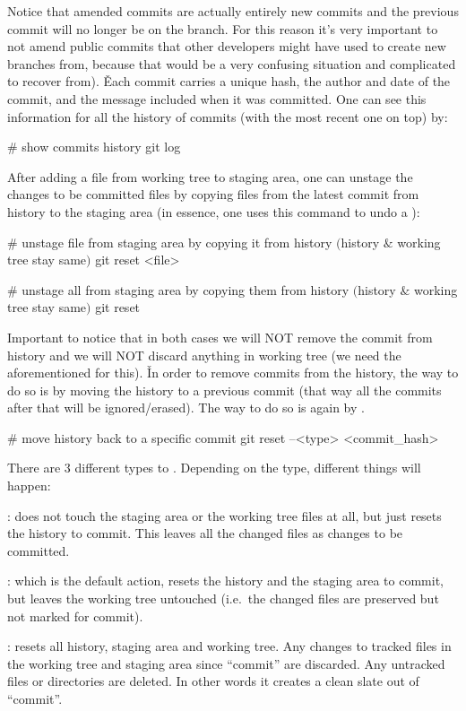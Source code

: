 Notice that amended commits are actually entirely new commits and the previous commit will no longer be on the branch.
For this reason it’s very important to not amend public commits that other developers might have used to create new
branches from, because that would be a very confusing situation and complicated to recover from). \v

Each commit carries a unique hash, the author and date of the commit, and the message included when it was committed.
One can see this information for all the history of commits (with the most recent one on top) by:

\begin{bash}
# show commits history
git log
\end{bash}


After adding a file from working tree to staging area, one can unstage the changes to be committed files by copying
files from the latest commit from history to the staging area (in essence, one uses this command to undo a ):

\begin{bash}
# unstage file from staging area by copying it from history $($history $\&$ working tree stay same$)$
git reset <file>
\end{bash}

\begin{bash}
# unstage all from staging area by copying them from history $($history $\&$ working tree stay same$)$
git reset
\end{bash}


Important to notice that in both cases we will NOT remove the commit from history and we will NOT discard anything in
working tree (we need the aforementioned  for this). \v

In order to remove commits from the history, the way to do so is by moving the history to a previous commit (that way
all the commits after that will be ignored/erased). The way to do so is again by .

\begin{bash}
# move history back to a specific commit
git reset --<type> <commit_hash>
\end{bash}

There are 3 different types to . Depending on the type, different things will happen:
\bit
\item {}: does not touch the staging area or the working tree files at all, but just resets the history to
commit. This leaves all the changed files as changes to be committed.
\item {}: which is the default action, resets the history and the staging area to commit, but leaves the
working tree untouched (i.e.\ the changed files are preserved but not marked for commit).
\item {}: resets all history, staging area and working tree. Any changes to tracked files in the working
tree and staging area since ``commit'' are discarded. Any untracked files or directories are deleted. In other words
it creates a clean slate out of ``commit''.
\eit

